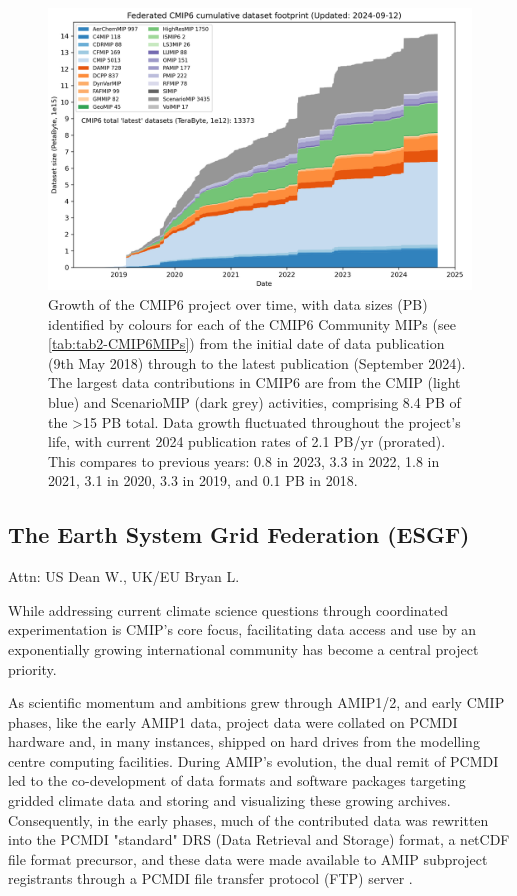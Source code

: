 \documentclass[gmd, preprint]{copernicus}
\def\cred#1{{\color{red}#1}}
\begin{document}
\begin{figure}
    \centering
    \includegraphics[width=1\linewidth]{240912T141943_ESGF-PublicationStatsPB.png}
    \caption{Growth of the CMIP6 project over time, with data sizes (PB) identified by colours for each of the CMIP6 Community MIPs (see \autoref{tab:tab2-CMIP6MIPs}) from the initial date of data publication (9th May 2018) through to the latest publication (September 2024). The largest data contributions in CMIP6 are from the CMIP (light blue) and ScenarioMIP (dark grey) activities, comprising 8.4 PB of the >15 PB total. Data growth fluctuated throughout the project's life, with current 2024 publication rates of 2.1 PB/yr (prorated). This compares to previous years: 0.8 in 2023, 3.3 in 2022, 1.8 in 2021, 3.1 in 2020, 3.3 in 2019, and 0.1 PB in 2018.}
    \label{fig:fig2-CMIP6DataGrowth}
\end{figure}


\subsection{The Earth System Grid Federation (ESGF)}
\label{sec:earthSystemGridFederation}
\cred{Attn: US Dean W., UK/EU Bryan L.}

While addressing current climate science questions through coordinated experimentation is CMIP's core focus, facilitating data access and use by an exponentially growing international community has become a central project priority. 

As scientific momentum and ambitions grew through AMIP1/2, and early CMIP phases, like the early AMIP1 data, project data were collated on PCMDI hardware and, in many instances, shipped on hard drives from the modelling centre computing facilities. During AMIP's evolution, the dual remit of PCMDI led to the co-development of data formats and software packages targeting gridded climate data and storing and visualizing these growing archives. Consequently, in the early phases, much of the contributed data was rewritten into the PCMDI "standard" DRS (Data Retrieval and Storage) format, a netCDF file format precursor, and these data were made available to AMIP subproject registrants through a PCMDI file transfer protocol (FTP) server \citep[see \autoref{tab:tab1-MIPsThroughTime};][]{gates_amip_1995}.
\end{document}
